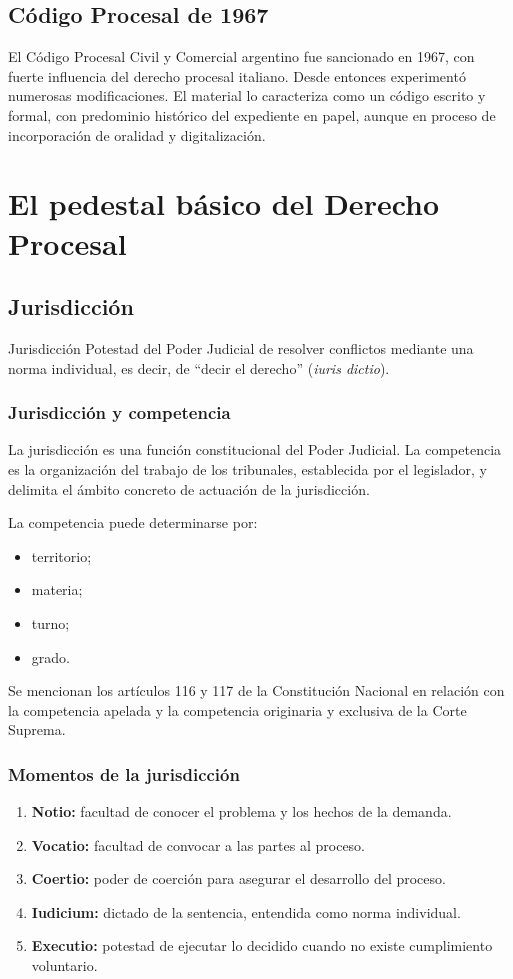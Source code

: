 \documentclass[12pt,oneside]{book}
\begin{document}
\section{Código Procesal de 1967}
El Código Procesal Civil y Comercial argentino fue sancionado en 1967, con fuerte influencia del derecho procesal italiano. Desde entonces experimentó numerosas modificaciones. El material lo caracteriza como un código escrito y formal, con predominio histórico del expediente en papel, aunque en proceso de incorporación de oralidad y digitalización.

\chapter{El pedestal básico del Derecho Procesal}
\section{Jurisdicción}
\begin{definition}{Jurisdicción}
Potestad del Poder Judicial de resolver conflictos mediante una norma individual, es decir, de ``decir el derecho'' (\textit{iuris dictio}).
\end{definition}

\subsection{Jurisdicción y competencia}
La jurisdicción es una función constitucional del Poder Judicial. La competencia es la organización del trabajo de los tribunales, establecida por el legislador, y delimita el ámbito concreto de actuación de la jurisdicción.

La competencia puede determinarse por:
\begin{itemize}
\item territorio;
\item materia;
\item turno;
\item grado.
\end{itemize}
Se mencionan los artículos 116 y 117 de la Constitución Nacional en relación con la competencia apelada y la competencia originaria y exclusiva de la Corte Suprema.

\subsection{Momentos de la jurisdicción}
\begin{enumerate}
\item \textbf{Notio:} facultad de conocer el problema y los hechos de la demanda.
\item \textbf{Vocatio:} facultad de convocar a las partes al proceso.
\item \textbf{Coertio:} poder de coerción para asegurar el desarrollo del proceso.
\item \textbf{Iudicium:} dictado de la sentencia, entendida como norma individual.
\item \textbf{Executio:} potestad de ejecutar lo decidido cuando no existe cumplimiento voluntario.
\end{enumerate}
\end{document}
